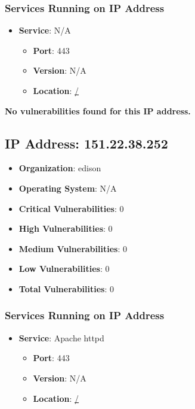 \documentclass{article}
\begin{document}
\subsubsection*{Services Running on IP Address}

\begin{itemize}
    
        \item \textbf{Service}: N/A
        \begin{itemize}
            \item \textbf{Port}: 443
            \item \textbf{Version}:  N/A 
            \item \textbf{Location}: \href{ / }{ / }
        \end{itemize}
    
\end{itemize}


\textbf{No vulnerabilities found for this IP address.}




\clearpage



\subsection{IP Address: 151.22.38.252}

\begin{itemize}
    \item \textbf{Organization}: edison
    \item \textbf{Operating System}:  N/A 
    \item \textbf{Critical Vulnerabilities}: 0
    \item \textbf{High Vulnerabilities}: 0
    \item \textbf{Medium Vulnerabilities}: 0
    \item \textbf{Low Vulnerabilities}: 0
    \item \textbf{Total Vulnerabilities}: 0
\end{itemize}

\subsubsection*{Services Running on IP Address}

\begin{itemize}
    
        \item \textbf{Service}: Apache httpd
        \begin{itemize}
            \item \textbf{Port}: 443
            \item \textbf{Version}:  N/A 
            \item \textbf{Location}: \href{ / }{ / }
        \end{itemize}
    
\end{itemize}
\end{document}
